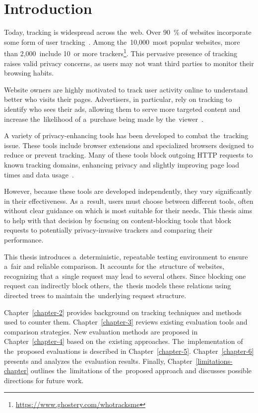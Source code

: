 \chapter{Introduction}
\label{chapter-1}
Today, tracking is widespread across the~web. Over 90~\% of websites incorporate some form of user tracking~\cite{90-percent-track}. Among the~10,000~most popular websites, more than 2,000~include 10~or more trackers\footnote{\url{https://www.ghostery.com/whotracksme}}. This pervasive presence of tracking raises valid privacy concerns, as users may not want third parties to monitor their browsing habits.

Website owners are highly motivated to track user activity online to understand better who visits their pages. Advertisers, in particular, rely on tracking to identify who sees their ads, allowing them to serve more targeted content and increase the~likelihood of a~purchase being made by the~viewer~\cite{behind-the-mirror}.

A variety of privacy-enhancing tools has been developed to combat the~tracking issue. These tools include browser extensions and specialized browsers designed to reduce or prevent tracking. Many of these tools block outgoing HTTP requests to known tracking domains, enhancing privacy and slightly improving page load times and data usage~\cite{content-blocking-saves-time, petranova-bit}.

However, because these tools are developed independently, they vary significantly in their effectiveness. As a~result, users must choose between different tools, often without clear guidance on which is most suitable for their needs. This thesis aims to help with that decision by focusing on content-blocking tools that block requests to potentially privacy-invasive trackers and comparing their performance.

This thesis introduces a~deterministic, repeatable testing environment to ensure a~fair and reliable comparison. It accounts for the~structure of websites, recognizing that a~single request may lead to several others. Since blocking one request can indirectly block others, the~thesis models these relations using directed trees to maintain the~underlying request structure.

Chapter~\ref{chapter-2} provides background on tracking techniques and methods used to counter them. Chapter~\ref{chapter-3} reviews existing evaluation tools and comparison strategies. New evaluation methods are proposed in Chapter~\ref{chapter-4} based on the~existing approaches. The~implementation of the~proposed evaluations is described in Chapter~\ref{chapter-5}. Chapter~\ref{chapter-6} presents and analyzes the~evaluation results. Finally, Chapter~\ref{limitations-chapter} outlines the~limitations of the~proposed approach and discusses possible directions for future work.
